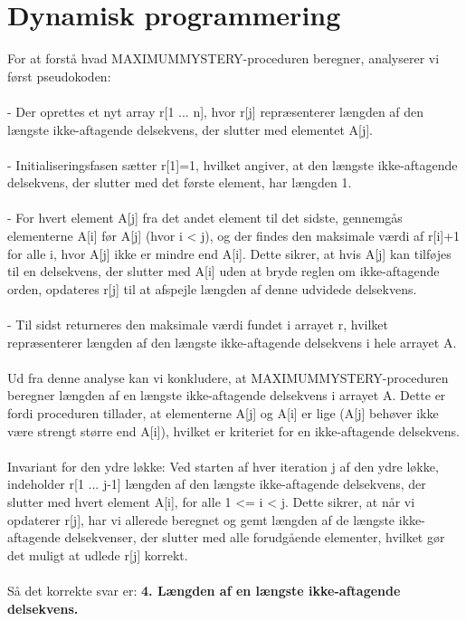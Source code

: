 \documentclass{article}
\begin{document}
\section{Dynamisk programmering}
For at forstå hvad MAXIMUMMYSTERY-proceduren beregner, analyserer vi først pseudokoden:
\\
\\
- Der oprettes et nyt array r[1 ... n], hvor r[j] repræsenterer længden af den længste ikke-aftagende delsekvens, der slutter med elementet A[j].
\\
\\
- Initialiseringsfasen sætter r[1]=1, hvilket angiver, at den længste ikke-aftagende delsekvens, der slutter med det første element, har længden 1.
\\
\\
- For hvert element A[j] fra det andet element til det sidste, gennemgås elementerne A[i] før A[j] (hvor i < j), og der findes den maksimale værdi af r[i]+1 for alle i, hvor A[j] ikke er mindre end A[i]. Dette sikrer, at hvis A[j] kan tilføjes til en delsekvens, der slutter med A[i] uden at bryde reglen om ikke-aftagende orden, opdateres r[j] til at afspejle længden af denne udvidede delsekvens.
\\
\\
- Til sidst returneres den maksimale værdi fundet i arrayet r, hvilket repræsenterer længden af den længste ikke-aftagende delsekvens i hele arrayet A.
\\
\\
Ud fra denne analyse kan vi konkludere, at MAXIMUMMYSTERY-proceduren beregner længden af en længste ikke-aftagende delsekvens i arrayet A. Dette er fordi proceduren tillader, at elementerne A[j] og A[i] er lige (A[j] behøver ikke være strengt større end A[i]), hvilket er kriteriet for en ikke-aftagende delsekvens.
\\
\\
Invariant for den ydre løkke: Ved starten af hver iteration j af den ydre løkke, indeholder r[1 ... j-1] længden af den længste ikke-aftagende delsekvens, der slutter med hvert element A[i], for alle 1 <= i < j. Dette sikrer, at når vi opdaterer r[j], har vi allerede beregnet og gemt længden af de længste ikke-aftagende delsekvenser, der slutter med alle forudgående elementer, hvilket gør det muligt at udlede r[j] korrekt.
\\
\\
Så det korrekte svar er: \textbf{4. Længden af en længste ikke-aftagende delsekvens.}
\end{document}
